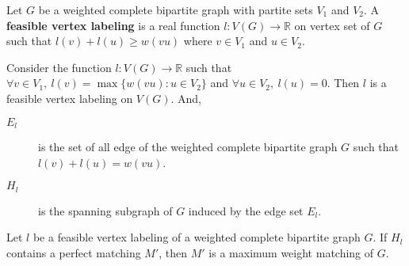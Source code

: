 \begin{definition}
	Let $G$ be a weighted complete bipartite graph with partite sets $V_1$ and $V_2$.
	A \textbf{feasible vertex labeling} is a real function $l : V(G) \to \mathbb{R}$ on vertex set of $G$ such that $l(v) + l(u) \ge w(vu)$ where $v \in V_1$ and $u \in V_2$.
\end{definition}

\begin{definition} Consider the function $l : V(G) \to \mathbb{R}$ such that \\
	$\forall v \in V_1,\ l(v) = \max \{ w(vu) : u \in V_2\}$ and $\forall u \in V_2,\ l(u) = 0$.
	Then $l$ is a feasible vertex labeling on $V(G)$.
	And,
	\begin{description}
		\item[$E_l$] is the set of all edge of the weighted complete bipartite graph $G$ such that $l(v)+l(u) = w(vu)$.
		\item[$H_l$] is the spanning subgraph of $G$ induced by the edge set $E_l$.
	\end{description}
\end{definition}

\begin{theorem}
	Let $l$ be a feasible vertex labeling of a weighted complete bipartite graph $G$.
	If $H_l$ contains a perfect matching $M'$, then $M'$ is a maximum weight matching of $G$.
\end{theorem}

